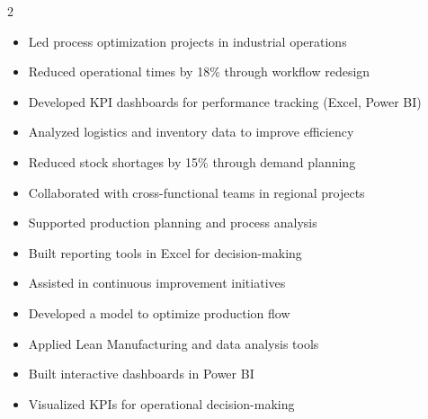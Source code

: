\documentclass[10pt,a4paper,withhyper]{altacv}
\begin{document}
\begin{paracol}{2}


\begin{itemize}
\item Led process optimization projects in industrial operations
\item Reduced operational times by 18\% through workflow redesign
\item Developed KPI dashboards for performance tracking (Excel, Power BI)
\end{itemize}

\divider

\begin{itemize}
\item Analyzed logistics and inventory data to improve efficiency
\item Reduced stock shortages by 15\% through demand planning
\item Collaborated with cross-functional teams in regional projects
\end{itemize}

\divider

\begin{itemize}
\item Supported production planning and process analysis
\item Built reporting tools in Excel for decision-making
\item Assisted in continuous improvement initiatives
\end{itemize}


\begin{itemize}
\item Developed a model to optimize production flow
\item Applied Lean Manufacturing and data analysis tools
\end{itemize}

\divider

\begin{itemize}
\item Built interactive dashboards in Power BI
\item Visualized KPIs for operational decision-making
\end{itemize}


\end{paracol}
\end{document}
